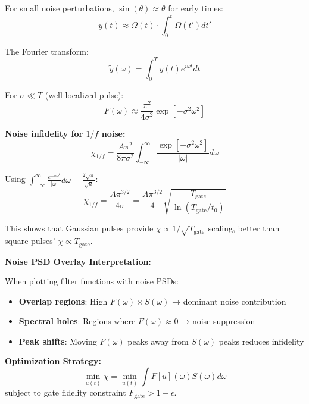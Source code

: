 \documentclass[11pt,a4paper]{article}
\theoremstyle{definition}
\theoremstyle{remark}
\begin{document}
For small noise perturbations, $\sin(\theta) \approx \theta$ for early times:
\begin{equation}
y(t) \approx \Omega(t) \cdot \int_0^t \Omega(t')dt'
\end{equation}

The Fourier transform:
\begin{equation}
\tilde{y}(\omega) = \int_0^T y(t)e^{i\omega t}dt
\end{equation}

For $\sigma \ll T$ (well-localized pulse):
\begin{equation}
F(\omega) \approx \frac{\pi^2}{4\sigma^2}\exp[-\sigma^2\omega^2]
\end{equation}

\textbf{Noise infidelity for $1/f$ noise:}
\begin{equation}
\chi_{1/f} = \frac{A\pi^2}{8\pi\sigma^2}\int_{-\infty}^{\infty} \frac{\exp[-\sigma^2\omega^2]}{|\omega|}d\omega
\end{equation}

Using $\int_{-\infty}^{\infty} \frac{e^{-a\omega^2}}{|\omega|}d\omega = \frac{2\sqrt{\pi}}{\sqrt{a}}$:
\begin{equation}
\chi_{1/f} = \frac{A\pi^{3/2}}{4\sigma} = \frac{A\pi^{3/2}}{4}\sqrt{\frac{T_{\text{gate}}}{\ln(T_{\text{gate}}/t_0)}}
\end{equation}

This shows that Gaussian pulses provide $\chi \propto 1/\sqrt{T_{\text{gate}}}$ scaling, better than square pulses' $\chi \propto T_{\text{gate}}$.

\textbf{Noise PSD Overlay Interpretation:}

When plotting filter functions with noise PSDs:
\begin{itemize}
    \item \textbf{Overlap regions}: High $F(\omega) \times S(\omega)$ → dominant noise contribution
    \item \textbf{Spectral holes}: Regions where $F(\omega) \approx 0$ → noise suppression
    \item \textbf{Peak shifts}: Moving $F(\omega)$ peaks away from $S(\omega)$ peaks reduces infidelity
\end{itemize}

\textbf{Optimization Strategy:}
\begin{equation}
\min_{u(t)} \chi = \min_{u(t)} \int F[u](\omega)S(\omega)d\omega
\end{equation}
subject to gate fidelity constraint $F_{\text{gate}} > 1 - \epsilon$.
\end{document}
